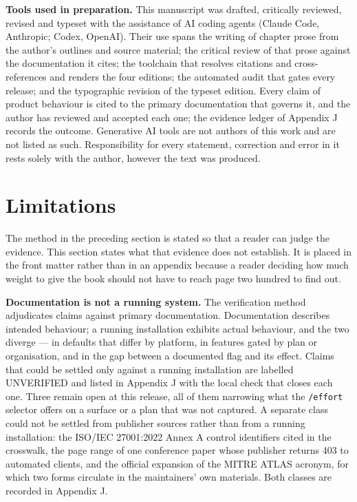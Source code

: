 \documentclass[11pt,a4paper,twoside,openany]{book}
\begin{document}
\textbf{Tools used in preparation.} This manuscript was drafted, critically reviewed, revised and typeset with the assistance of AI coding agents (Claude Code, Anthropic; Codex, OpenAI). Their use spans the writing of chapter prose from the author's outlines and source material; the critical review of that prose against the documentation it cites; the toolchain that resolves citations and cross-references and renders the four editions; the automated audit that gates every release; and the typographic revision of the typeset edition. Every claim of product behaviour is cited to the primary documentation that governs it, and the author has reviewed and accepted each one; the evidence ledger of Appendix J records the outcome. Generative AI tools are not authors of this work and are not listed as such. Responsibility for every statement, correction and error in it rests solely with the author, however the text was produced.


\FloatBarrier
\section*{Limitations}

The method in the preceding section is stated so that a reader can judge the evidence. This section states what that evidence does not establish. It is placed in the front matter rather than in an appendix because a reader deciding how much weight to give the book should not have to reach page two hundred to find out.


\textbf{Documentation is not a running system.} The verification method adjudicates claims against primary documentation. Documentation describes intended behaviour; a running installation exhibits actual behaviour, and the two diverge — in defaults that differ by platform, in features gated by plan or organisation, and in the gap between a documented flag and its effect. Claims that could be settled only against a running installation are labelled UNVERIFIED and listed in Appendix J with the local check that closes each one. Three remain open at this release, all of them narrowing what the \texttt{/\allowbreak{}effort} selector offers on a surface or a plan that was not captured. A separate class could not be settled from publisher sources rather than from a running installation: the ISO/IEC 27001:2022 Annex A control identifiers cited in the crosswalk, the page range of one conference paper whose publisher returns 403 to automated clients, and the official expansion of the MITRE ATLAS acronym, for which two forms circulate in the maintainers' own materials. Both classes are recorded in Appendix J.
\end{document}
